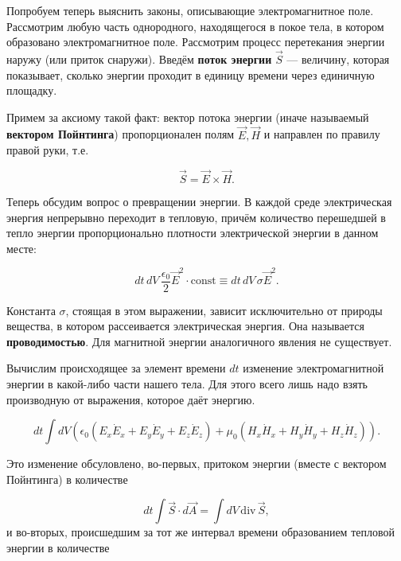 \documentclass[12pt,a4paper]{article}
\numberwithin{equation}{section}
\numberwithin{equation}{section}
\renewcommand{\div}{\mathrm{div}\,}
\newcommand{\eps}{\epsilon}
\newcommand{\const}{\mathrm{const}}
\begin{document}
Попробуем теперь выяснить законы, описывающие электромагнитное
поле. Рассмотрим любую часть однородного, находящегося в покое тела, в
котором образовано электромагнитное поле. Рассмотрим процесс
перетекания энергии наружу (или приток снаружи). Введём \textbf{поток
  энергии} $\vec{S}$ --- величину, которая показывает, сколько энергии
проходит в единицу времени через единичную площадку.

Примем за аксиому такой факт: вектор потока энергии (иначе называемый
\textbf{вектором Пойнтинга}) пропорционален полям $\vec{E}, \vec{H}$ и
направлен по правилу правой руки, т.е.

\begin{equation}
  \label{eq:def_pointing}
  \vec{S} = \vec{E} \times \vec{H}.
\end{equation}


Теперь обсудим вопрос о превращении энергии. В каждой среде
электрическая энергия непрерывно переходит в тепловую, причём
количество перешедшей в тепло энергии пропорционально плотности
электрической энергии в данном месте:

\begin{equation}
  \label{eq:def_heat_from_electric}
  dt\, dV\, \frac{\eps_0}{2} \vec{E}^2 \cdot \const \equiv dt\, dV\,
  \sigma \vec{E}^2.
\end{equation}

Константа $\sigma$, стоящая в этом выражении, зависит исключительно от
природы вещества, в котором рассеивается электрическая энергия. Она
называется \textbf{проводимостью}. Для магнитной энергии аналогичного
явления не существует.

Вычислим происходящее за элемент времени $dt$ изменение
электромагнитной энергии в какой-либо части нашего тела. Для этого
всего лишь надо взять производную от выражения, которое даёт энергию. 

\begin{equation}
  \label{eq:conserv_energy_der_1}
  dt \int dV \left( \eps_0 (E_x \dot{E}_x + E_y \dot{E}_y +
    E_z \dot{E}_z) + \mu_0 (H_x \dot{H}_x + H_y \dot{H}_y +
    H_z \dot{H}_z) \right).
\end{equation}

Это изменение обсуловлено, во-первых, притоком энергии (вместе с
вектором Пойнтинга) в количестве

\begin{equation}
  \label{eq:conserv_energy_der_2}
  dt \int \vec{S} \cdot d\vec{A} =  \int dV\, \div \vec{S} ,
\end{equation}
и во-вторых, происшедшим за тот же интервал времени образованием
тепловой энергии в количестве 
\end{document}
